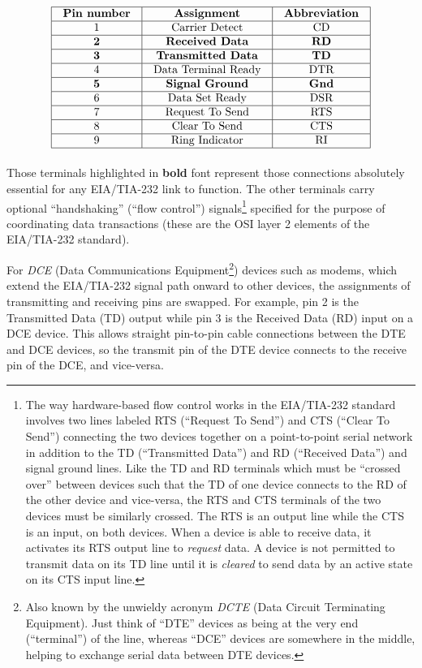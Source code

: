 $$\vbox{\offinterlineskip
\halign{\strut
\vrule \quad\hfil # \ \hfil & 
\vrule \quad\hfil # \ \hfil & 
\vrule \quad\hfil # \ \hfil \vrule \cr
\noalign{\hrule}
%
\textbf{Pin number} & \textbf{Assignment} & \textbf{Abbreviation} \cr
%
\noalign{\hrule}
%
1 & Carrier Detect & CD \cr
%
\noalign{\hrule}
%
\textbf{2} & \textbf{Received Data} & \textbf{RD} \cr
%
\noalign{\hrule}
%
\textbf{3} & \textbf{Transmitted Data} & \textbf{TD} \cr
%
\noalign{\hrule}
%
4 & Data Terminal Ready & DTR \cr
%
\noalign{\hrule}
%
\textbf{5} & \textbf{Signal Ground} & \textbf{Gnd} \cr
%
\noalign{\hrule}
%
6 & Data Set Ready & DSR \cr
%
\noalign{\hrule}
%
7 & Request To Send & RTS \cr
%
\noalign{\hrule}
%
8 & Clear To Send & CTS \cr
%
\noalign{\hrule}
%
9 & Ring Indicator & RI \cr
%
\noalign{\hrule}
} %
}$$ %

Those terminals highlighted in \textbf{bold} font represent those connections absolutely essential for any EIA/TIA-232 link to function.  The other terminals carry optional ``handshaking'' (``flow control'') signals\footnote{The way hardware-based flow control works in the EIA/TIA-232 standard involves two lines labeled RTS (``Request To Send'') and CTS (``Clear To Send'') connecting the two devices together on a point-to-point serial network in addition to the TD (``Transmitted Data'') and RD (``Received Data'') and signal ground lines.  Like the TD and RD terminals which must be ``crossed over'' between devices such that the TD of one device connects to the RD of the other device and vice-versa, the RTS and CTS terminals of the two devices must be similarly crossed.  The RTS is an output line while the CTS is an input, on both devices.  When a device is able to receive data, it activates its RTS output line to \textit{request} data.  A device is not permitted to transmit data on its TD line until it is \textit{cleared} to send data by an active state on its CTS input line.} specified for the purpose of coordinating data transactions (these are the OSI layer 2 elements of the EIA/TIA-232 standard).    

For \textit{DCE} (Data Communications Equipment\footnote{Also known by the unwieldy acronym \textit{DCTE} (Data Circuit Terminating Equipment).  Just think of ``DTE'' devices as being at the very end (``terminal'') of the line, whereas ``DCE'' devices are somewhere in the middle, helping to exchange serial data between DTE devices.}) devices such as modems, which extend the EIA/TIA-232 signal path onward to other devices, the assignments of transmitting and receiving pins are swapped.  For example, pin 2 is the Transmitted Data (TD) output while pin 3 is the Received Data (RD) input on a DCE device.  This allows straight pin-to-pin cable connections between the DTE and DCE devices, so the transmit pin of the DTE device connects to the receive pin of the DCE, and vice-versa.    


